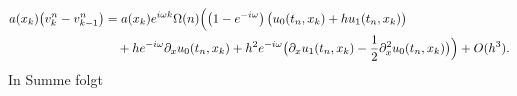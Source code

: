 \begin{align}
\begin{split}\label{wkb:ortdiff}
a(x_k) \bigl( v^n_k - v^n_{k-1} \bigr)
&= a(x_k) e^{i \omega k} \Omega(n) \Bigl( \left(1-e^{-i \omega}\right) \bigl( u_0(t_n, x_k) + h u_1(t_n, x_k) \bigr)\\
&\quad + h e^{-i \omega} \partial_x u_0(t_n, x_k) + h^2 e^{-i \omega} \bigl( \partial_x u_1(t_n, x_k) - \frac{1}{2} \partial^2_x u_0(t_n, x_k) \bigr) \Bigr) + O(h^3).
\end{split}
\end{align}
In Summe folgt
